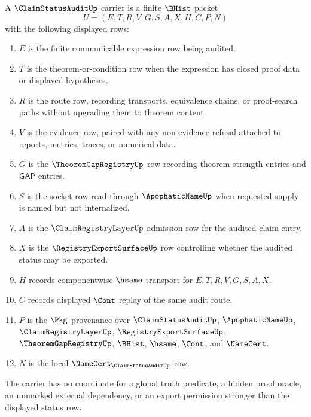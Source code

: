 \begin{definition}
\label{def:legitimate-claim-status-audit-carrier}
A $\ClaimStatusAuditUp$ carrier is a finite $\BHist$ packet
$$
U=(E,T,R,V,G,S,A,X,H,C,P,N)
$$
with the following displayed rows:
\begin{enumerate}
\item $E$ is the finite communicable expression row being audited.
\item $T$ is the theorem-or-condition row when the expression has closed proof data or displayed hypotheses.
\item $R$ is the route row, recording transports, equivalence chains, or proof-search paths without upgrading them to theorem content.
\item $V$ is the evidence row, paired with any non-evidence refusal attached to reports, metrics, traces, or numerical data.
\item $G$ is the $\TheoremGapRegistryUp$ row recording theorem-strength entries and $\mathsf{GAP}$ entries.
\item $S$ is the socket row read through $\ApophaticNameUp$ when requested supply is named but not internalized.
\item $A$ is the $\ClaimRegistryLayerUp$ admission row for the audited claim entry.
\item $X$ is the $\RegistryExportSurfaceUp$ row controlling whether the audited status may be exported.
\item $H$ records componentwise $\hsame$ transport for $E,T,R,V,G,S,A,X$.
\item $C$ records displayed $\Cont$ replay of the same audit route.
\item $P$ is the $\Pkg$ provenance over $\ClaimStatusAuditUp$, $\ApophaticNameUp$, $\ClaimRegistryLayerUp$, $\RegistryExportSurfaceUp$, $\TheoremGapRegistryUp$, $\BHist$, $\hsame$, $\Cont$, and $\NameCert$.
\item $N$ is the local $\NameCert_{\ClaimStatusAuditUp}$ row.
\end{enumerate}
The carrier has no coordinate for a global truth predicate, a hidden proof oracle, an unmarked external dependency, or an export permission stronger than the displayed status row.
\end{definition}

